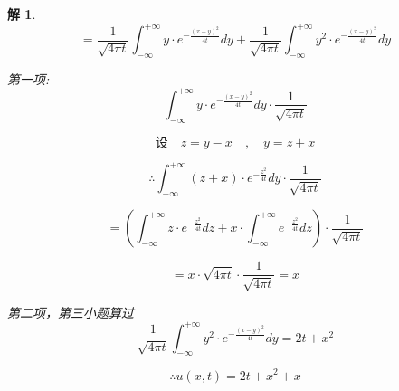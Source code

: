 \documentclass[12pt,a4paper]{article}
\newtheorem*{solution}{解}
\begin{document}
\begin{solution}
\begin{equation*}
	= \frac{1}{\sqrt{4\pi t}} \int_{-\infty}^{+\infty} y \cdot e^{-\frac{(x-y)^2}{4t}} dy + \frac{1}{\sqrt{4\pi t}} \int_{-\infty}^{+\infty} y^2 \cdot e^{-\frac{(x-y)^2}{4t}} dy
\end{equation*}

第一项:
\begin{equation*}
	\int_{-\infty}^{+\infty} y \cdot e^{-\frac{(x-y)^2}{4t}} dy \cdot \frac{1}{\sqrt{4\pi t}}
\end{equation*}

\begin{equation*}
	\text{设} \quad z = y - x \quad , \quad y = z + x
\end{equation*}

\begin{equation*}
	\therefore \int_{-\infty}^{+\infty} (z + x) \cdot e^{-\frac{z^2}{4t}} dy \cdot \frac{1}{\sqrt{4\pi t}}
\end{equation*}

\begin{equation*}
	= \left( \int_{-\infty}^{+\infty} z \cdot e^{-\frac{z^2}{4t}} dz + x \cdot \int_{-\infty}^{+\infty} e^{-\frac{z^2}{4t}} dz \right) \cdot \frac{1}{\sqrt{4\pi t}}
\end{equation*}

\begin{equation*}
	= x \cdot \sqrt{4\pi t} \cdot \frac{1}{\sqrt{4\pi t}} = x
\end{equation*}


第二项，第三小题算过
\begin{equation*}
\frac{1}{\sqrt{4\pi t}}\int_{-\infty}^{+\infty} y^2 \cdot e^{-\frac{(x-y)^2}{4t}} dy=2t+x^2
\end{equation*}



\begin{equation*}
	\therefore u(x,t) = 2t + x^2 + x
\end{equation*}

	
	
\end{solution}
\end{document}
